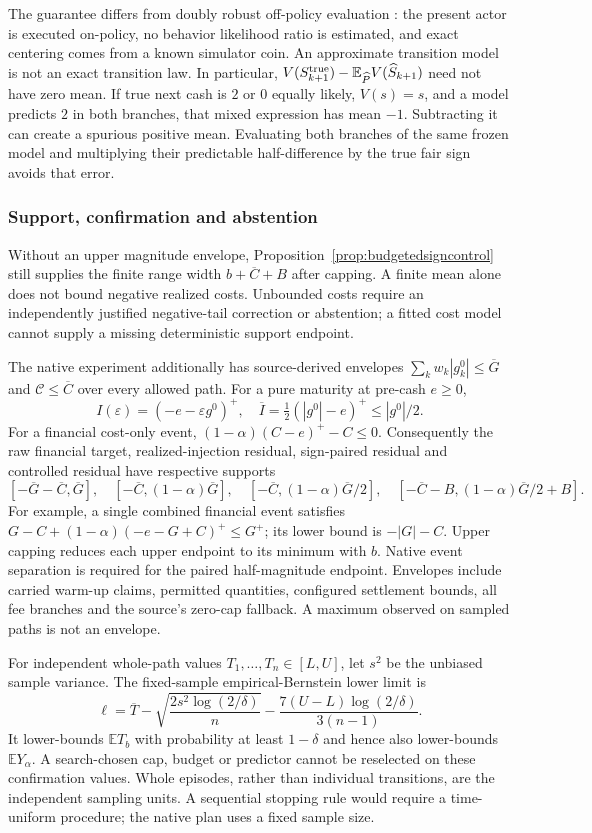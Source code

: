 The guarantee differs from doubly robust off-policy evaluation \cite{jiang2016doublyrobust}: the present actor is executed on-policy, no behavior likelihood ratio is estimated, and exact centering comes from a known simulator coin. An approximate transition model is not an exact transition law. In particular, $V(S_{k+1}^{\rm true})-\mathbb E_{\widehat P}V(\widehat S_{k+1})$ need not have zero mean. If true next cash is $2$ or $0$ equally likely, $V(s)=s$, and a model predicts $2$ in both branches, that mixed expression has mean $-1$. Subtracting it can create a spurious positive mean. Evaluating both branches of the same frozen model and multiplying their predictable half-difference by the true fair sign avoids that error.

\subsubsection{Support, confirmation and abstention}
Without an upper magnitude envelope, Proposition~\ref{prop:budgetedsigncontrol} still supplies the finite range width $b+\overline C+B$ after capping. A finite mean alone does not bound negative realized costs. Unbounded costs require an independently justified negative-tail correction or abstention; a fitted cost model cannot supply a missing deterministic support endpoint.

The native experiment additionally has source-derived envelopes
$\sum_k w_k|g_k^0|\le\overline G$ and $\mathcal C\le\overline C$ over every allowed path. For a pure maturity at pre-cash $e\ge0$,
\[
I(\varepsilon)=(-e-\varepsilon g^0)^+,
\quad \overline I=\tfrac12(|g^0|-e)^+\le |g^0|/2.
\]
For a financial cost-only event, $(1-\alpha)(C-e)^+-C\le0$. Consequently the raw financial target, realized-injection residual, sign-paired residual and controlled residual have respective supports
\[
[-\overline G-\overline C,\overline G],\quad
[-\overline C,(1-\alpha)\overline G],\quad
[-\overline C,(1-\alpha)\overline G/2],\quad
[-\overline C-B,(1-\alpha)\overline G/2+B].
\]
For example, a single combined financial event satisfies
$G-C+(1-\alpha)(-e-G+C)^+\le G^+$; its lower bound is $-|G|-C$. Upper capping reduces each upper endpoint to its minimum with $b$. Native event separation is required for the paired half-magnitude endpoint. Envelopes include carried warm-up claims, permitted quantities, configured settlement bounds, all fee branches and the source's zero-cap fallback. A maximum observed on sampled paths is not an envelope.

For independent whole-path values $T_1,\ldots,T_n\in[L,U]$, let $s^2$ be the unbiased sample variance. The fixed-sample empirical-Bernstein lower limit \cite{maurer2009empirical} is
\[
\ell=\overline T-
\sqrt{\frac{2s^2\log(2/\delta)}{n}}
-\frac{7(U-L)\log(2/\delta)}{3(n-1)}.
\]
It lower-bounds $\mathbb ET_b$ with probability at least $1-\delta$ and hence also lower-bounds $\mathbb EY_\alpha$. A search-chosen cap, budget or predictor cannot be reselected on these confirmation values. Whole episodes, rather than individual transitions, are the independent sampling units. A sequential stopping rule would require a time-uniform procedure; the native plan uses a fixed sample size.

